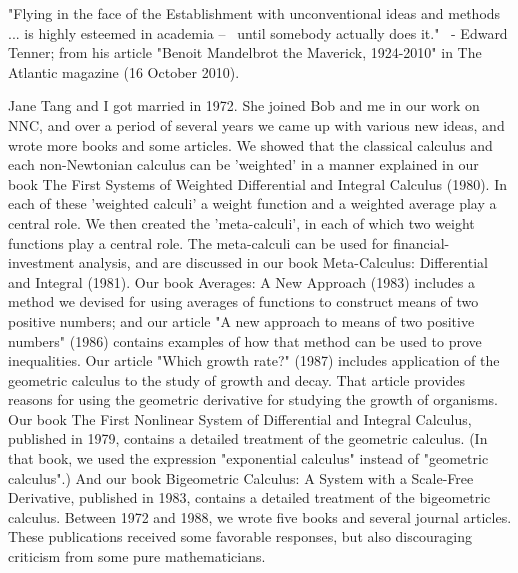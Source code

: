 \documentclass[12pt]{article}
\begin{document}
"Flying in the face of the Establishment with unconventional ideas and methods ... is highly esteemed in academia --  until somebody actually does it."
 - Edward Tenner; from his article "Benoit Mandelbrot the Maverick, 1924-2010" in The Atlantic magazine (16 October 2010).

Jane Tang and I got married in 1972. She joined Bob and me in our work on NNC, and over a period of several years we came up with various new ideas, and wrote more books and some articles. We showed that the classical calculus and each non-Newtonian calculus can be 'weighted' in a manner explained in our book The First Systems of Weighted Differential and Integral Calculus (1980). In each of these 'weighted calculi' a weight function and a weighted average play a central role. We then created the 'meta-calculi', in each of which two weight functions play a central role. The meta-calculi can be used for financial-investment analysis, and are discussed in our book Meta-Calculus: Differential and Integral (1981). Our book Averages: A New Approach (1983) includes a method we devised for using averages of functions to construct means of two positive numbers; and our article "A new approach to means of two positive numbers" (1986) contains examples of how that method can be used to prove inequalities. Our article "Which growth rate?" (1987) includes application of the geometric calculus to the study of growth and decay. That article provides reasons for using the geometric derivative for studying the growth of organisms. Our book The First Nonlinear System of Differential and Integral Calculus, published in 1979, contains a detailed treatment of the geometric calculus. (In that book, we used the expression "exponential calculus" instead of "geometric calculus".) And our book Bigeometric Calculus: A System with a Scale-Free Derivative, published in 1983, contains a detailed treatment of the bigeometric calculus. Between 1972 and 1988, we wrote five books and several journal articles. These publications received some favorable responses, but also discouraging criticism from some pure mathematicians.
\end{document}
